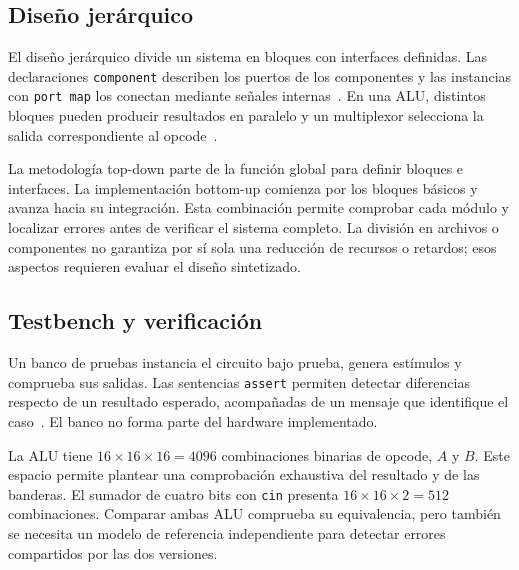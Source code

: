 \subsection{Diseño jerárquico}
El diseño jerárquico divide un sistema en bloques con interfaces
definidas. Las declaraciones \texttt{component} describen los
puertos de los componentes y las instancias con \texttt{port map}
los conectan mediante señales internas~\cite{jerarquia}.
En una ALU, distintos bloques pueden producir resultados en paralelo
y un multiplexor selecciona la salida correspondiente al
opcode~\cite{casoalu}.

La metodología top-down parte de la función global para definir
bloques e interfaces. La implementación bottom-up comienza por los
bloques básicos y avanza hacia su integración. Esta combinación
permite comprobar cada módulo y localizar errores antes de verificar
el sistema completo. La división en archivos o componentes no
garantiza por sí sola una reducción de recursos o retardos; esos
aspectos requieren evaluar el diseño sintetizado.

\subsection{Testbench y verificación}
Un banco de pruebas instancia el circuito bajo prueba, genera
estímulos y comprueba sus salidas. Las sentencias \texttt{assert}
permiten detectar diferencias respecto de un resultado esperado,
acompañadas de un mensaje que identifique el caso~\cite{fundamentos,casoalu}.
El banco no forma parte del hardware implementado.

La ALU tiene $16\times16\times16=4096$ combinaciones binarias de
opcode, $A$ y $B$. Este espacio permite plantear una comprobación
exhaustiva del resultado y de las banderas. El sumador de cuatro
bits con \texttt{cin} presenta $16\times16\times2=512$
combinaciones. Comparar ambas ALU comprueba su equivalencia, pero
tambi\'en se necesita un modelo de referencia independiente para
detectar errores compartidos por las dos versiones.
